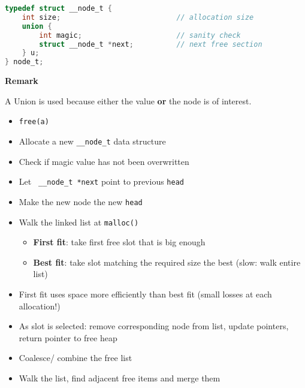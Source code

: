 \begin{lstlisting}[language={C}]
typedef struct __node_t {
    int size;                           // allocation size
    union {
        int magic;                      // sanity check
        struct __node_t *next;          // next free section
    } u;
} node_t;         
\end{lstlisting}
\textbf{Remark}

A Union is used because either the  value \textbf{or} the  node is of interest.


\begin{itemize}
    \item \lstinline{free(a)}
    \item Allocate a new \lstinline{__node_t} data structure
    \item Check if magic value has not been overwritten
    \item Let \lstinline{ __node_t *next} point to previous \lstinline{head}
    \item Make the new node the new \lstinline{head}
\end{itemize}


\begin{itemize}
    \item Walk the linked list at \lstinline{malloc()} %
          \begin{itemize}
              \item \textbf{First fit}: take first free slot that is big enough
              \item \textbf{Best fit}: take slot matching the required size the best (slow: walk entire list)
          \end{itemize}
    \item First fit uses space more efficiently than best fit (small losses at each allocation!)
    \item As slot is selected: remove corresponding node from list, update pointers, return pointer to free heap
\end{itemize}


\begin{itemize}
    \item Coalesce/ combine the free list
    \item Walk the list, find adjacent free items and merge them
\end{itemize}

